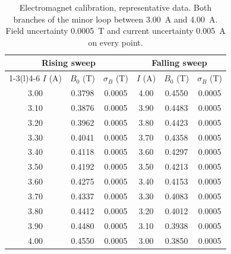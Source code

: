 \documentclass[11pt,a4paper]{article}
\begin{document}
\begin{table}[H]
\centering
\caption{Electromagnet calibration, representative data. Both branches of the minor loop between
\SI{3.00}{\ampere} and \SI{4.00}{\ampere}. Field uncertainty \SI{0.0005}{\tesla} and current
uncertainty \SI{0.005}{\ampere} on every point.}
\label{tab:a3}
\scriptsize
\begin{tabular}{ccc@{\hspace{2cm}}ccc}
\toprule
\multicolumn{3}{c}{Rising sweep} & \multicolumn{3}{c}{Falling sweep} \\
\cmidrule(r){1-3}\cmidrule(l){4-6}
$I$ (\si{\ampere}) & $B_0$ (\si{\tesla}) & $\sigma_B$ (\si{\tesla}) & $I$ (\si{\ampere}) & $B_0$ (\si{\tesla}) & $\sigma_B$ (\si{\tesla}) \\
\midrule
3.00 & 0.3798 & 0.0005 & 4.00 & 0.4550 & 0.0005 \\
3.10 & 0.3876 & 0.0005 & 3.90 & 0.4483 & 0.0005 \\
3.20 & 0.3962 & 0.0005 & 3.80 & 0.4423 & 0.0005 \\
3.30 & 0.4041 & 0.0005 & 3.70 & 0.4358 & 0.0005 \\
3.40 & 0.4118 & 0.0005 & 3.60 & 0.4297 & 0.0005 \\
3.50 & 0.4192 & 0.0005 & 3.50 & 0.4213 & 0.0005 \\
3.60 & 0.4275 & 0.0005 & 3.40 & 0.4153 & 0.0005 \\
3.70 & 0.4337 & 0.0005 & 3.30 & 0.4083 & 0.0005 \\
3.80 & 0.4412 & 0.0005 & 3.20 & 0.4012 & 0.0005 \\
3.90 & 0.4480 & 0.0005 & 3.10 & 0.3938 & 0.0005 \\
4.00 & 0.4550 & 0.0005 & 3.00 & 0.3850 & 0.0005 \\
\bottomrule
\end{tabular}
\end{table}
\end{document}
